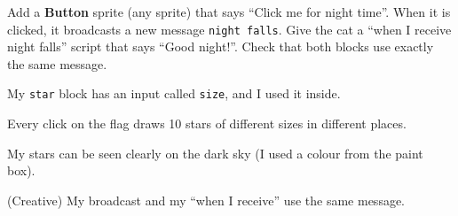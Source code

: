 \begin{creative}
Add a \textbf{Button} sprite (any sprite) that says \enquote{Click me for night time}. When it is clicked, it broadcasts a new message \texttt{night falls}. Give the cat a \enquote{when I receive night falls} script that says \enquote{Good night!}. Check that both blocks use exactly the same message.
\end{creative}

\begin{selfcheck}
  \item My \texttt{star} block has an input called \texttt{size}, and I used it inside.
  \item Every click on the flag draws 10 stars of different sizes in different places.
  \item My stars can be seen clearly on the dark sky (I used a colour from the paint box).
  \item (Creative) My broadcast and my \enquote{when I receive} use the same message.
\end{selfcheck}
